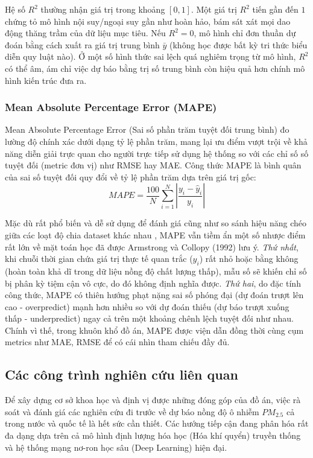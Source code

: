Hệ số $R^2$ thường nhận giá trị trong khoảng $[0, 1]$. Một giá trị $R^2$ tiến gần đến $1$ chứng tỏ mô hình nội suy/ngoại suy gần như hoàn hảo, bám sát xát mọi dao động thăng trầm của dữ liệu mục tiêu. Nếu $R^2 = 0$, mô hình chỉ đơn thuần dự đoán bằng cách xuất ra giá trị trung bình $\bar{y}$ (không học được bất kỳ tri thức biểu diễn quy luật nào). Ở một số hình thức sai lệch quá nghiêm trọng từ mô hình, $R^2$ có thể âm, ám chỉ việc dự báo bằng trị số trung bình còn hiệu quả hơn chính mô hình kiến trúc đưa ra.

\subsubsection{Mean Absolute Percentage Error (MAPE)}

Mean Absolute Percentage Error (Sai số phần trăm tuyệt đối trung bình) đo lường độ chính xác dưới dạng tỷ lệ phần trăm, mang lại ưu điểm vượt trội về khả năng diễn giải trực quan cho người trực tiếp sử dụng hệ thống so với các chỉ số số tuyệt đối (metric đơn vị) như RMSE hay MAE. Công thức MAPE là bình quân của sai số tuyệt đối quy đổi về tỷ lệ phần trăm dựa trên giá trị gốc:
\begin{equation}
    MAPE = \frac{100}{N} \sum_{i=1}^{N} \left| \frac{y_i - \hat{y}_i}{y_i} \right|
\end{equation}

Mặc dù rất phổ biến và dễ sử dụng để đánh giá cũng như so sánh hiệu năng chéo giữa các loạt độ chia dataset khác nhau \cite{armstrong1992mape}, MAPE vẫn tiềm ẩn một số nhược điểm rất lớn về mặt toán học đã được Armstrong và Collopy (1992) lưu ý. \textit{Thứ nhất}, khi chuỗi thời gian chứa giá trị thực tế quan trắc ($y_i$) rất nhỏ hoặc bằng không (hoàn toàn khả dĩ trong dữ liệu nồng độ chất lượng thấp), mẫu số sẽ khiến chỉ số bị phân kỳ tiệm cận vô cực, do đó không định nghĩa được. \textit{Thứ hai}, do đặc tính công thức, MAPE có thiên hướng phạt nặng sai số phóng đại (dự đoán trượt lên cao - overpredict) mạnh hơn nhiều so với dự đoán thiếu (dự báo trượt xuống thấp - underpredict) ngay cả trên một khoảng chênh lệch tuyệt đối như nhau. Chính vì thế, trong khuôn khổ đồ án, MAPE được viện dẫn đồng thời cùng cụm metrics như MAE, RMSE để có cái nhìn tham chiếu đầy đủ.

\subsection{Các công trình nghiên cứu liên quan}

Để xây dựng cơ sở khoa học và định vị được những đóng góp của đồ án, việc rà soát và đánh giá các nghiên cứu đi trước về dự báo nồng độ ô nhiễm $PM_{2.5}$ cả trong nước và quốc tế là hết sức cần thiết. Các hướng tiếp cận đang phân hóa rất đa dạng dựa trên cả mô hình định lượng hóa học (Hóa khí quyển) truyền thống và hệ thống mạng nơ-ron học sâu (Deep Learning) hiện đại.

